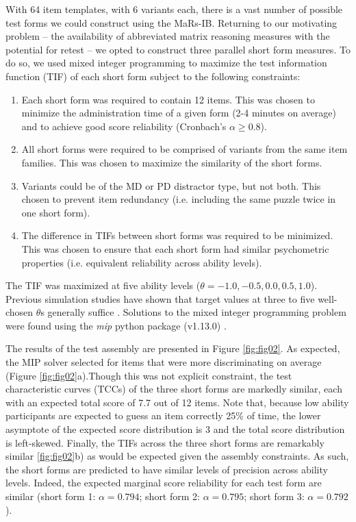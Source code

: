 \documentclass[a4paper,man,natbib]{apa6}
\begin{document}
With 64 item templates, with 6 variants each, there is a vast number of possible test forms we could construct using the MaRs-IB. Returning to our motivating problem -- the availability of abbreviated matrix reasoning measures with the potential for retest -- we opted to construct three parallel short form measures. To do so, we used mixed integer programming \citep{der2005wj} to maximize the test information function (TIF) of each short form subject to the following constraints:

\begin{enumerate}

    \item Each short form was required to contain 12 items. This was chosen to minimize the administration time of a given form (2-4 minutes on average) and to achieve good score reliability (Cronbach's $\alpha \geq 0.8$).
    
    \item All short forms were required to be comprised of variants from the same item families. This was chosen to maximize the similarity of the short forms.
    
    \item Variants could be of the MD or PD distractor type, but not both. This chosen to prevent item redundancy (i.e. including the same puzzle twice in one short form).
    
    \item The difference in TIFs between short forms was required to be minimized. This was chosen to ensure that each short form had similar psychometric properties (i.e. equivalent reliability across ability levels). 
    
\end{enumerate}

\noindent The TIF was maximized at five ability levels ($\theta = -1.0, -0.5, 0.0, 0.5, 1.0$). Previous simulation studies have shown that target values at three to five well-chosen $\theta$s generally suffice \citep{der2005wj}. Solutions to the mixed integer programming problem were found using the \textit{mip} python package (v1.13.0) \citep{santos2020mixed}.

The results of the test assembly are presented in Figure \ref{fig:fig02}. As expected, the MIP solver selected for items that were more discriminating on average (Figure \ref{fig:fig02}a).Though this was not explicit constraint, the test characteristic curves (TCCs) of the three short forms are markedly similar, each with an expected total score of 7.7 out of 12 items. Note that, because low ability participants are expected to guess an item correctly 25\% of time, the lower asymptote of the expected score distribution is 3 and the total score distribution is left-skewed. Finally, the TIFs across the three short forms are remarkably similar \ref{fig:fig02}b) as would be expected given the assembly constraints. As such, the short forms are predicted to have similar levels of precision across ability levels. Indeed, the expected marginal score reliability for each test form are similar (short form 1: $\alpha = 0.794$; short form 2: $\alpha = 0.795$; short form 3: $\alpha = 0.792$). 
\end{document}

